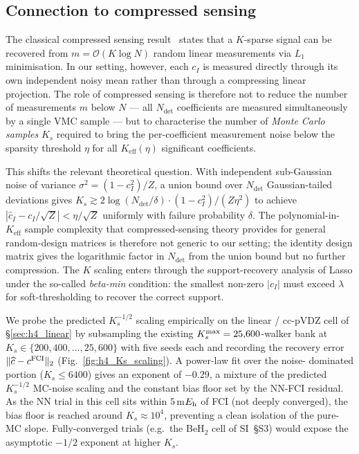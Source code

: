 \documentclass[journal=jctcce,manuscript=article,layout=traditional]{achemso}
\begin{document}
\subsection{Connection to compressed sensing}
\label{sec:cs_connection}

The classical compressed sensing
result~\cite{Candes2006CS,Donoho2006CS,Candes2005RIP,Tropp2004coherence}
states that a $K$-sparse signal can be recovered from
$m = \mathcal{O}(K \log N)$ random linear measurements via $L_1$
minimisation. In our setting, however, each $c_I$ is measured directly
through its own independent noisy mean rather than through a
compressing linear projection. The role of compressed sensing is
therefore not to reduce the number of measurements $m$ below $N$ ---
all $N_{\mathrm{det}}$ coefficients are measured simultaneously by a
single VMC sample --- but to characterise the number of \emph{Monte
Carlo samples} $K_s$ required to bring the per-coefficient measurement
noise below the sparsity threshold $\eta$ for all $K_{\text{eff}}(\eta)$
significant coefficients.

This shifts the relevant theoretical question. With independent
sub-Gaussian noise of variance $\sigma^2 = (1 - c_I^2)/Z$, a union
bound over $N_{\mathrm{det}}$ Gaussian-tailed deviations gives
$K_s \gtrsim 2 \log(N_{\mathrm{det}}/\delta) \cdot
(1 - c_I^2) / (Z \eta^2)$
to achieve $|\widehat{c}_I - c_I/\sqrt{Z}| < \eta / \sqrt{Z}$ uniformly
with failure probability $\delta$. The polynomial-in-$K_{\text{eff}}$
sample complexity that compressed-sensing theory provides for general
random-design matrices is therefore not generic to our setting; the
identity design matrix gives the logarithmic factor in
$N_{\mathrm{det}}$ from the union bound but no further compression. The
$K$ scaling enters through the support-recovery analysis of Lasso
under the so-called \emph{beta-min} condition: the smallest non-zero
$|c_I|$ must exceed $\lambda$ for soft-thresholding to recover the
correct support.

We probe the predicted $K_s^{-1/2}$ scaling empirically on the
 linear / cc-pVDZ cell of \S\ref{sec:h4_linear} by
subsampling the existing $K_s^{\rm max}=25{,}600$-walker bank at
$K_s \in \{200, 400, \ldots, 25{,}600\}$ with five seeds each and
recording the recovery error $\|\widehat c - c^{\rm FCI}\|_2$
(Fig.~\ref{fig:h4_Ks_scaling}). A power-law fit over the noise-
dominated portion ($K_s \le 6400$) gives an exponent of $-0.29$, a
mixture of the predicted $K_s^{-1/2}$ MC-noise scaling and the
constant bias floor set by the NN-FCI residual. As the NN trial
in this cell sits within $5$\,m$E_{\rm h}$ of FCI (not deeply
converged), the bias floor is reached around $K_s \approx 10^4$,
preventing a clean isolation of the pure-MC slope. Fully-converged
trials (e.g.\ the BeH$_2$ cell of SI~\S S3)
would expose the asymptotic $-1/2$ exponent at higher $K_s$.
\end{document}
